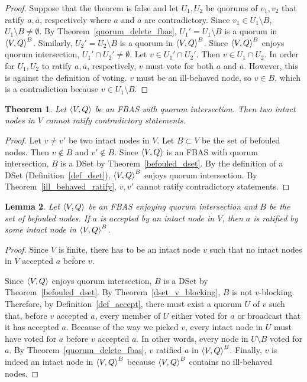 \documentclass[12pt, psamsfonts]{amsart}
\newtheorem{thm}{Theorem}[section]
\newtheorem{lem}[thm]{Lemma}
\theoremstyle{definition}
\theoremstyle{remark}
\numberwithin{equation}{section}
\begin{document}
\begin{proof}
    Suppose that the theorem is false and let $U_1, U_2$ be quorums of $v_1, v_2$ that ratify $a, \bar{a}$, respectively where $a$ and $\bar{a}$ are contradictory.
    Since $v_1 \in U_1 \setminus B$,  $U_1 \setminus B \ne \emptyset$.
    By Theorem~\ref{quorum_delete_fbas}, $U_1' = U_1 \setminus B$ is a quorum in $\ev{V, Q}^B$.
    Similarly, $U_2' = U_2 \setminus B$ is a quorum in $\ev{V, Q}^B$.
    Since $\ev{V, Q}^B$ enjoys quorum intersection, $U_1' \cap U_2' \ne \emptyset$.
    Let $v \in U_1' \cap U_2'$.
    Then $v \in U_1 \cap U_2$.
    In order for $U_1, U_2$ to ratify $a, \bar{a}$, respectively, $v$ must vote for both $a$ and $\bar{a}$.
    However, this is against the definition of voting.
    $v$ must be an ill-behaved node, so $v \in B$, which is a contradiction because $v \in U_1 \setminus B$.
\end{proof}

\begin{thm}\label{intact_ratify_contradictory}
    Let $\ev{V, Q}$ be an FBAS with quorum intersection.
    Then two intact nodes in $V$ cannot ratify contradictory statements.
\end{thm}

\begin{proof}
    Let $v \ne v'$ be two intact nodes in $V$.
    Let $B \subset V$ be the set of befouled nodes.
    Then $v \notin B$ and $v' \notin B$.
    Since $\ev{V, Q}$ is an FBAS with quorum intersection, $B$ is a DSet by Theorem~\ref{befouled_dset}.
    By the definition of a DSet (Definition~\ref{def_dset}), $\ev{V, Q}^B$ enjoys quorum intersection.
    By Theorem~\ref{ill_behaved_ratify}, $v, v'$ cannot ratify contradictory statements.
\end{proof}

\begin{lem}\label{lem_intact_ratify}
    Let $\ev{V, Q}$ be an FBAS enjoying quorum intersection and $B$ be the set of befouled nodes.
    If $a$ is accepted by an intact node in $V$, then $a$ is ratified by some intact node in $\ev{V, Q}^B$.
\end{lem}

\begin{proof}
    Since $V$ is finite, there has to be an intact node $v$ such that no intact nodes in $V$ accepted $a$ before $v$.

    Since $\ev{V, Q}$ enjoys quorum intersection, $B$ is a DSet by Theorem~\ref{befouled_dset}.
    By Theorem~\ref{dset_v_blocking}, $B$ is not $v$-blocking.
    Therefore, by Definition~\ref{def_accept}, there must exist a quorum $U$ of $v$ such that, before $v$ accepted $a$, every member of $U$ either voted for $a$ or broadcast that it has accepted $a$.
    Because of the way we picked $v$, every intact node in $U$ must have voted for $a$ before $v$ accepted $a$.
    In other words, every node in $U \setminus B$ voted for $a$.
    By Theorem~\ref{quorum_delete_fbas}, $v$ ratified $a$ in ${\ev{V, Q}}^B$.
    Finally, $v$ is indeed an intact node in ${\ev{V, Q}}^B$ because ${\ev{V, Q}}^B$ contains no ill-behaved nodes.
\end{proof}
\end{document}
